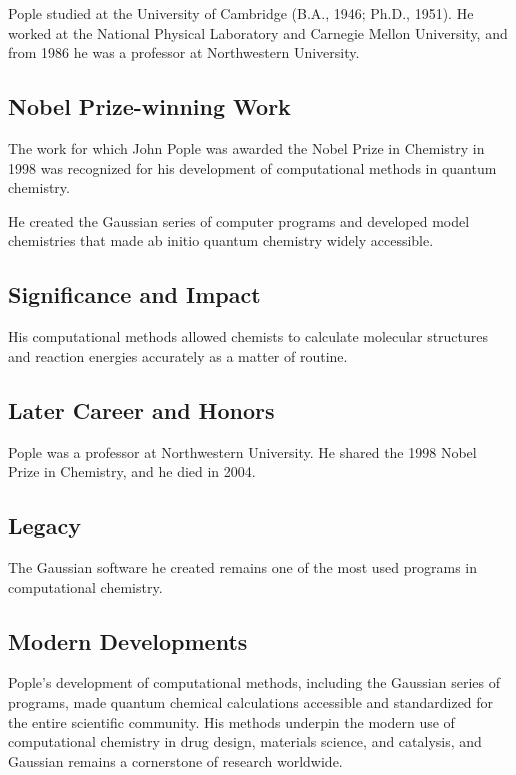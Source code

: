 Pople studied at the University of Cambridge (B.A., 1946; Ph.D., 1951). He worked at the National Physical Laboratory and Carnegie Mellon University, and from 1986 he was a professor at Northwestern University.

\subsection*{Nobel Prize-winning Work}

The work for which John Pople was awarded the Nobel Prize in Chemistry in 1998 was recognized for his development of computational methods in quantum chemistry.

He created the Gaussian series of computer programs and developed model chemistries that made ab initio quantum chemistry widely accessible.

\subsection*{Significance and Impact}

His computational methods allowed chemists to calculate molecular structures and reaction energies accurately as a matter of routine.

\subsection*{Later Career and Honors}

Pople was a professor at Northwestern University. He shared the 1998 Nobel Prize in Chemistry, and he died in 2004.

\subsection*{Legacy}

The Gaussian software he created remains one of the most used programs in computational chemistry.

\subsection*{Modern Developments}

Pople's development of computational methods, including the Gaussian series of programs, made quantum chemical calculations accessible and standardized for the entire scientific community. His methods underpin the modern use of computational chemistry in drug design, materials science, and catalysis, and Gaussian remains a cornerstone of research worldwide.


